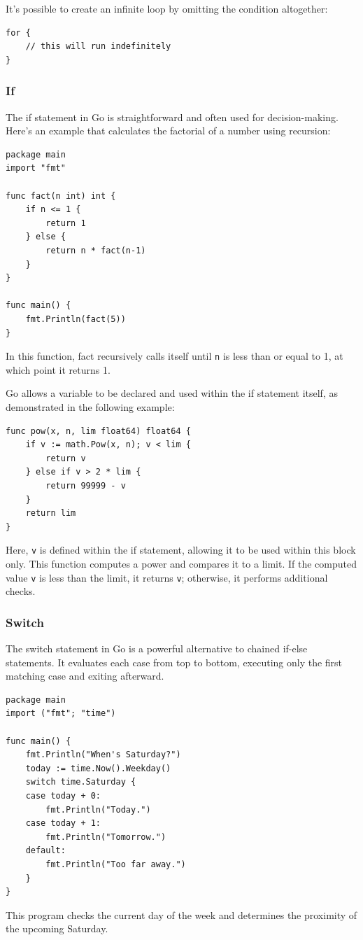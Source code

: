 It’s possible to create an infinite loop by omitting the condition altogether:
\begin{verbatim}
for {
    // this will run indefinitely
}
\end{verbatim}

\subsubsection{If}
The if statement in Go is straightforward and often used for decision-making. Here’s an example that calculates the factorial of a number using recursion:

\begin{verbatim}
package main
import "fmt"

func fact(n int) int {
    if n <= 1 {
        return 1
    } else {
        return n * fact(n-1)
    }
}

func main() {
    fmt.Println(fact(5))
}
\end{verbatim}
In this function, fact recursively calls itself until \texttt{n} is less than or equal to 1, at which point it returns 1.

Go allows a variable to be declared and used within the if statement itself, as demonstrated in the following example:

\begin{verbatim}
func pow(x, n, lim float64) float64 {
    if v := math.Pow(x, n); v < lim {
        return v
    } else if v > 2 * lim {
        return 99999 - v
    }
    return lim
}
\end{verbatim}
Here, \texttt{v} is defined within the if statement, allowing it to be used within this block only. This function computes a power and compares it to a limit. If the computed value \texttt{v} is less than the limit, it returns \texttt{v}; otherwise, it performs additional checks.

\subsubsection{Switch}
The switch statement in Go is a powerful alternative to chained if-else statements. It evaluates each case from top to bottom, executing only the first matching case and exiting afterward.

\begin{verbatim}
package main
import ("fmt"; "time")

func main() {
    fmt.Println("When's Saturday?")
    today := time.Now().Weekday()
    switch time.Saturday {
    case today + 0:
        fmt.Println("Today.")
    case today + 1:
        fmt.Println("Tomorrow.")
    default:
        fmt.Println("Too far away.")
    }
}
\end{verbatim}
This program checks the current day of the week and determines the proximity of the upcoming Saturday.

